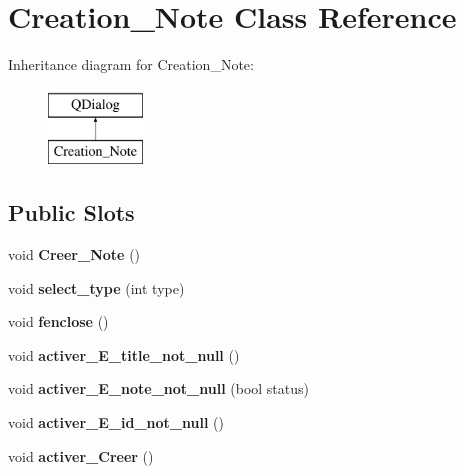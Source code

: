 \hypertarget{class_creation___note}{}\section{Creation\+\_\+\+Note Class Reference}
\label{class_creation___note}
Inheritance diagram for Creation\+\_\+\+Note\+:\begin{figure}[H]
\begin{center}
\leavevmode
\includegraphics[height=2.000000cm]{class_creation___note}
\end{center}
\end{figure}
\subsection*{Public Slots}
\begin{DoxyCompactItemize}
\item 
\mbox{\label{class_creation___note_a533d14d9799dfb6257de99778d38a8ba}} 
void {\bfseries Creer\+\_\+\+Note} ()
\item 
\mbox{\label{class_creation___note_a4627e5957db87af2b7c43937857e9d6e}} 
void {\bfseries select\+\_\+type} (int type)
\item 
\mbox{\label{class_creation___note_a280ec768b1c2b99bdf885089c32c0134}} 
void {\bfseries fenclose} ()
\item 
\mbox{\label{class_creation___note_a2b9c2eabbcff615f1f02f092a4706295}} 
void {\bfseries activer\+\_\+\+E\+\_\+title\+\_\+not\+\_\+null} ()
\item 
\mbox{\label{class_creation___note_a55a85cdf537406058368bbdb3d3e8ed1}} 
void {\bfseries activer\+\_\+\+E\+\_\+note\+\_\+not\+\_\+null} (bool status)
\item 
\mbox{\label{class_creation___note_abe23b774f4d9964f6d745d4c1d6e1621}} 
void {\bfseries activer\+\_\+\+E\+\_\+id\+\_\+not\+\_\+null} ()
\item 
\mbox{\label{class_creation___note_a07b8f673a499c2cf3b47ff990b7c80ef}} 
void {\bfseries activer\+\_\+\+Creer} ()
\end{DoxyCompactItemize}
